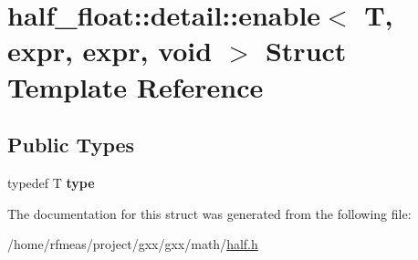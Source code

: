\hypertarget{structhalf__float_1_1detail_1_1enable_3_01T_00_01expr_00_01expr_00_01void_01_4}{}\section{half\+\_\+float\+:\+:detail\+:\+:enable$<$ T, expr, expr, void $>$ Struct Template Reference}
\label{structhalf__float_1_1detail_1_1enable_3_01T_00_01expr_00_01expr_00_01void_01_4}
\subsection*{Public Types}
\begin{DoxyCompactItemize}
\item 
typedef T {\bfseries type}\hypertarget{structhalf__float_1_1detail_1_1enable_3_01T_00_01expr_00_01expr_00_01void_01_4_ac5b0ec94780275726b1deadc8affc811}{}\label{structhalf__float_1_1detail_1_1enable_3_01T_00_01expr_00_01expr_00_01void_01_4_ac5b0ec94780275726b1deadc8affc811}

\end{DoxyCompactItemize}


The documentation for this struct was generated from the following file\+:\begin{DoxyCompactItemize}
\item 
/home/rfmeas/project/gxx/gxx/math/\hyperlink{half_8h}{half.\+h}\end{DoxyCompactItemize}
